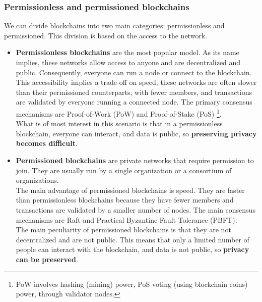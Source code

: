 \subsubsection{Permissionless and permissioned blockchains}
\label{subsubsec:comparison}
We can divide blockchains into two main categories: permissionless and permissioned.
This division is based on the access to the network.
\begin{itemize}
    \item \textbf{Permissionless blockchains} are the most popular model. As its name implies, these 
    networks allow access to anyone and are decentralized and public. Consequently, 
    everyone can run a node or connect to the blockchain.\\
    This accessibility implies a trade-off on speed; these networks are often slower than 
    their permissioned counterparts, with fewer members, and transactions are validated by 
    everyone running a connected node. The primary consensus mechanisms are Proof-of-Work 
    (PoW) and Proof-of-Stake (PoS) \footnote{PoW involves hashing (mining) power, PoS voting 
    (using blockchain coins) power, through validator nodes.}.\\
    What is of most interest in this scenario is that in a permissionless blockchain, 
    everyone can interact, and data is public, so \textbf{preserving privacy becomes difficult}.
    \item \textbf{Permissioned blockchains} are private networks that require permission to
    join. They are usually run by a single organization or a consortium of organizations.\\
    The main advantage of permissioned blockchains is speed. They are faster than
    permissionless blockchains because they have fewer members and transactions are
    validated by a smaller number of nodes. The main consensus mechanisms are Raft and 
    Practical Byzantine Fault Tolerance (PBFT).\\
    The main peculiarity of permissioned blockchains is that they are not decentralized
    and are not public. This means that only a limited number of people can interact with
    the blockchain, and data is not public, so \textbf{privacy can be preserved}.
\end{itemize}

